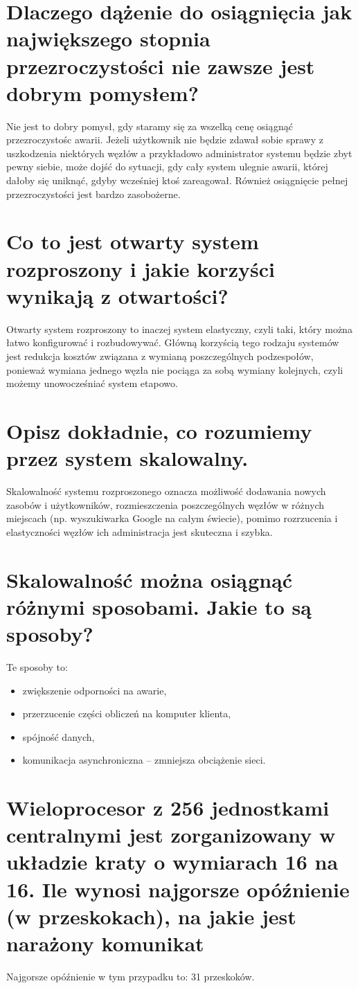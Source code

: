\documentclass[10pt,a4paper]{article}
\begin{document}
\section{\normalsize{Dlaczego dążenie do osiągnięcia jak największego stopnia przezroczystości nie zawsze jest dobrym pomysłem?}}
Nie jest to dobry pomysł, gdy staramy się za wszelką cenę osiągnąć przezroczystośc awarii. Jeżeli użytkownik nie będzie zdawał sobie sprawy z uszkodzenia niektórych węzłów a przykładowo administrator systemu będzie zbyt pewny siebie, może dojść do sytuacji, gdy cały system ulegnie awarii, której dałoby się uniknąć, gdyby wcześniej ktoś zareagował. Również osiągnięcie pełnej przezroczystości jest bardzo zasobożerne.
\section{\normalsize{Co to jest otwarty system rozproszony i jakie korzyści wynikają z otwartości?}}
Otwarty system rozproszony to inaczej system elastyczny, czyli taki, który można łatwo konfigurować i rozbudowywać.
Główną korzyścią tego rodzaju systemów jest redukcja kosztów związana z wymianą poszczególnych podzespołów, ponieważ wymiana jednego węzła nie pociąga za sobą wymiany kolejnych, czyli możemy unowocześniać system etapowo.
\section{\normalsize{Opisz dokładnie, co rozumiemy przez system skalowalny.}}
Skalowalność systemu rozproszonego oznacza możliwość dodawania nowych zasobów i użytkowników, rozmieszczenia poszczególnych węzłów w różnych miejscach (np. wyszukiwarka Google na całym świecie), pomimo rozrzucenia i elastyczności węzłów ich administracja jest skuteczna i szybka.
\section{\normalsize{Skalowalność można osiągnąć różnymi sposobami. Jakie to są sposoby?}} 
Te sposoby to:
\begin{itemize}
\item{zwiększenie odporności na awarie,}
\item{przerzucenie części obliczeń na komputer klienta,}
\item{spójność danych,}
\item{komunikacja asynchroniczna -- zmniejsza obciążenie sieci.}
\end{itemize}
\section{\normalsize{Wieloprocesor z 256 jednostkami centralnymi jest zorganizowany w układzie kraty o wymiarach 16 na 16. Ile wynosi najgorsze opóźnienie (w przeskokach), na jakie jest narażony komunikat}}
Najgorsze opóźnienie w tym przypadku to: 31 przeskoków.
\end{document}
